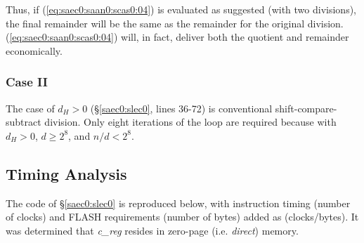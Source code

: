 \documentclass[letterpaper,10pt,titlepage]{article}
\begin{document}
Thus, if (\ref{eq:saec0:saan0:scas0:04}) is evaluated as suggested (with
two divisions), the final remainder will be the same as the remainder for the
original division.  (\ref{eq:saec0:saan0:scas0:04}) will, in fact, deliver both
the quotient and remainder economically.


\subsubsection{Case II}
\label{saec0:saan0:scas1}

The case of $d_H > 0$ (\S{}\ref{saec0:slec0}, lines 36-72) is conventional
shift-compare-subtract division.  Only eight iterations of the loop are required
because with $d_H > 0$, $d \geq 2^8$, and $n/d < 2^8$.



\subsection{Timing Analysis}
\label{saec0:stan0}

The code of \S{}\ref{saec0:slec0} is reproduced below, with instruction
timing (number of clocks) and FLASH requirements (number of bytes) added
as (clocks/bytes).  It was determined that \emph{c\_reg} resides
in zero-page (i.e. \emph{direct}) memory.
\end{document}
